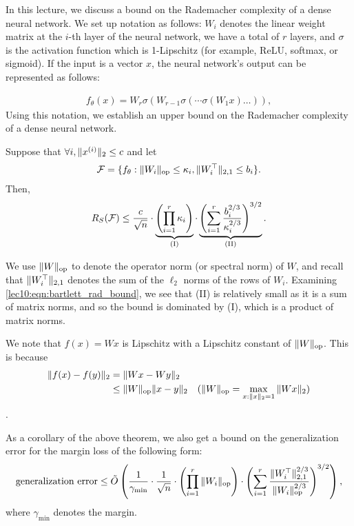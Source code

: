In this lecture, we discuss a bound on the Rademacher complexity of a dense neural network. We set up notation as follows: $W_i$ denotes the linear weight matrix at the $i$-th layer of the neural network, we have a total of $r$ layers, and $\sigma$ is the activation function which is 1-Lipschitz (for example, ReLU, softmax, or sigmoid). If the input is a vector $x$, the neural network's output can be represented as follows:

\begin{align}
f_\theta(x) = W_r\sigma(W_{r-1}\sigma(\cdots \sigma(W_1x)\ldots)),
\end{align}
Using this notation, we establish an upper bound on the Rademacher complexity of a dense neural network.

\begin{theorem}
	\label{lec10:thm:dnn_rademacher}
	Suppose that $\forall i, \|x^{(i)}\|_2 \leq c$ and let
	\begin{align}
	\mathcal F = \{f_\theta : \|W_i\|_{\textup{op}} \leq \kappa_i, \|W_i^\top\|_{2,1} \leq b_i\}.
	\end{align}
	Then,
	\begin{equation}
	R_S (\mathcal F) \leq \frac{c}{\sqrt{n}} \cdot \underbrace{\left(\prod_{i=1}^r \kappa_i \right)}_{\textup{(I)}} \cdot \underbrace{\left( \sum_{i=1}^r\frac{b_i^{2/3}}{\kappa_i^{2/3}}\right)^{3/2}}_{\textup{(II)}}. \label{lec10:eqn:bartlett_rad_bound}
	\end{equation}
\end{theorem}
We use $\|W\|_{\textup{op}}$ to denote the operator norm (or spectral norm) of $W$, and recall that $\|W_i^\top\|_{2,1}$ denotes the sum of the $\ell_2$ norms of the rows of $W_i$. Examining \eqref{lec10:eqn:bartlett_rad_bound}, we see that (II) is relatively small as it is a sum of matrix norms, and so the bound is dominated by (I), which is a product of matrix norms.

\begin{remark}
	We note that $f(x) = Wx$ is Lipschitz with a Lipschitz constant of $\|W\|_{\textup{op}}$. This is because 
	\begin{align}
	\|f(x)-f(y)\|_2 &= \|Wx-Wy\|_2 \\
	&\leq \|W\|_{\textup{op}}\|x-y\|_2 &\text{$(\|W\|_{\textup{op}} = \max_{x:\|x\|_2=1}\|Wx\|_2)$}
	\end{align}. 
\end{remark}

\begin{remark}
	As a corollary of the above theorem, we also get a bound on the generalization error for the margin loss of the following form:
	\begin{equation}
	\textup{generalization error} \leq \tilde{O}\left(\frac{1}{\gamma_{\min}} \cdot \frac{1}{\sqrt{n}} \cdot \left(\prod_{i=1}^r\|W_i\|_{\textup{op}} \right) \cdot {\left( \sum_{i=1}^r\frac{\|W_i^\top\|^{2/3}_{2,1}}{\|W_i\|_{\textup{op}}^{2/3}}\right)^{3/2}}  \right),
	\end{equation}
	where $\gamma_{\min}$ denotes the margin.
\end{remark}

